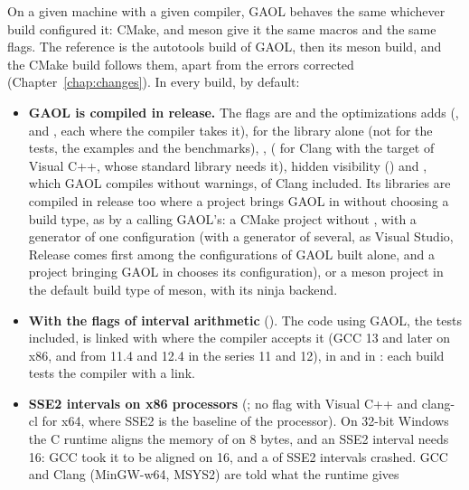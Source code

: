 \documentclass[12pt,a4paper,twoside,openright]{book}
\begin{document}
On a given machine with a given compiler, GAOL behaves the same whichever
build configured it: CMake,  and meson give it the same macros
and the same flags. The reference is the autotools build of GAOL, then its
meson build, and the CMake build follows them, apart from the errors corrected
(Chapter~\ref{chap:changes}). In every build, by default:

\begin{itemize}
\item[$\bullet$] \textbf{GAOL is compiled in release.} The flags are
   and the optimizations  adds
  (,  and
  ,
  each where the compiler takes it),  for the
  library alone (not for the tests, the examples and the benchmarks),
  ,  ( for Clang with the
  target of Visual C++, whose standard library needs it), hidden visibility
  () and
  , which GAOL compiles without warnings,
   of Clang included. Its libraries are compiled in
  release too where a project brings GAOL in without choosing a build type, as
  by a  calling GAOL's: a CMake project without
  , with a generator of one configuration (with a
  generator of several, as Visual Studio, Release comes first among the
  configurations of GAOL built alone, and a project bringing GAOL in chooses
  its configuration), or a meson project in the default build type of meson,
  with its ninja backend.\newinvfive
\item[$\bullet$] \textbf{With the flags of interval arithmetic}
  (). The code using GAOL, the tests included, is linked
  with  where the compiler accepts it (GCC 13 and later
  on x86, and from 11.4 and 12.4 in the series 11 and 12), in
   and in : each build tests the compiler with
  a link.\newinvfive
\item[$\bullet$] \textbf{SSE2 intervals on x86 processors}
  (; no flag with Visual C++ and clang-cl for x64, where
  SSE2 is the baseline of the processor). On 32-bit Windows the C runtime
  aligns the memory of  on 8 bytes, and an SSE2 interval needs 16:
  GCC took it to be aligned on 16, and a  of SSE2 intervals
  crashed. GCC and Clang (MinGW-w64, MSYS2) are told what the runtime gives

\end{itemize}
\end{document}
